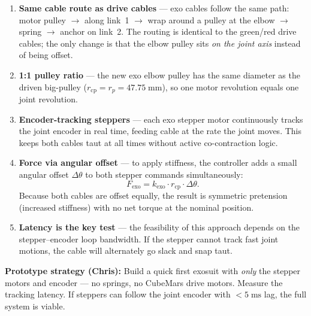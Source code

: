 \documentclass[11pt, a4paper]{article}
\begin{document}
\begin{enumerate}
    \item \textbf{Same cable route as drive cables} --- exo cables follow
          the same path: motor pulley $\to$ along link~1 $\to$
          wrap around a pulley at the elbow $\to$ spring $\to$ anchor on
          link~2.  The routing is identical to the green/red drive cables;
          the only change is that the elbow pulley sits \emph{on the joint
          axis} instead of being offset.
    \item \textbf{1:1 pulley ratio} --- the new exo elbow pulley has the
          same diameter as the driven big-pulley
          ($r_{\text{cp}} = r_p = 47.75\;\text{mm}$), so one motor
          revolution equals one joint revolution.
    \item \textbf{Encoder-tracking steppers} --- each exo stepper motor
          continuously tracks the joint encoder in real time, feeding cable
          at the rate the joint moves.  This keeps both cables taut at all
          times without active co-contraction logic.
    \item \textbf{Force via angular offset} --- to apply stiffness, the
          controller adds a small angular offset $\Delta\theta$ to both
          stepper commands simultaneously:
          \begin{equation}\label{eq:chris-force}
              F_{\text{exo}} = k_{\text{exo}} \cdot r_{\text{cp}} \cdot \Delta\theta.
          \end{equation}
          Because both cables are offset equally, the result is symmetric
          pretension (increased stiffness) with no net torque at the nominal
          position.
    \item \textbf{Latency is the key test} --- the feasibility of this
          approach depends on the stepper--encoder loop bandwidth.  If the
          stepper cannot track fast joint motions, the cable will alternately
          go slack and snap taut.
\end{enumerate}

\begin{mdframed}
\textbf{Prototype strategy (Chris):}
Build a quick first exosuit with \emph{only} the stepper motors and encoder
--- no springs, no CubeMars drive motors.  Measure the tracking latency.  If
steppers can follow the joint encoder with $<5\;\text{ms}$ lag, the full
system is viable.
\end{mdframed}
\end{document}
